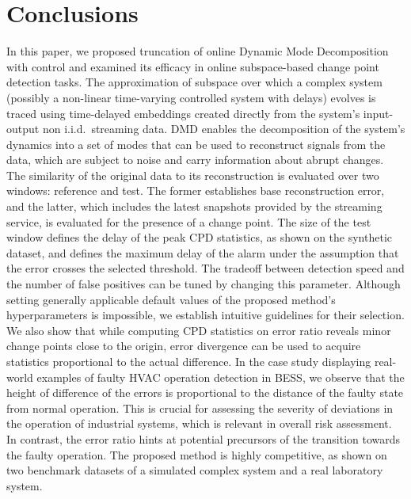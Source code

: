 \section{Conclusions}\label{sec:conclusions}
In this paper, we proposed truncation of online Dynamic Mode Decomposition with control and examined its efficacy in online subspace-based change point detection tasks. The approximation of subspace over which a complex system (possibly a non-linear time-varying controlled system with delays) evolves is traced using time-delayed embeddings created directly from the system's input-output non i.i.d.~streaming data. DMD enables the decomposition of the system's dynamics into a set of modes that can be used to reconstruct signals from the data, which are subject to noise and carry information about abrupt changes. The similarity of the original data to its reconstruction is evaluated over two windows: reference and test. The former establishes base reconstruction error, and the latter, which includes the latest snapshots provided by the streaming service, is evaluated for the presence of a change point. The size of the test window defines the delay of the peak CPD statistics, as shown on the synthetic dataset, and defines the maximum delay of the alarm under the assumption that the error crosses the selected threshold. The tradeoff between detection speed and the number of false positives can be tuned by changing this parameter. Although setting generally applicable default values of the proposed method's hyperparameters is impossible, we establish intuitive guidelines for their selection. We also show that while computing CPD statistics on error ratio reveals minor change points close to the origin, error divergence can be used to acquire statistics proportional to the actual difference. In the case study displaying real-world examples of faulty HVAC operation detection in BESS, we observe that the height of difference of the errors is proportional to the distance of the faulty state from normal operation. This is crucial for assessing the severity of deviations in the operation of industrial systems, which is relevant in overall risk assessment. In contrast, the error ratio hints at potential precursors of the transition towards the faulty operation. The proposed method is highly competitive, as shown on two benchmark datasets of a simulated complex system and a real laboratory system.

